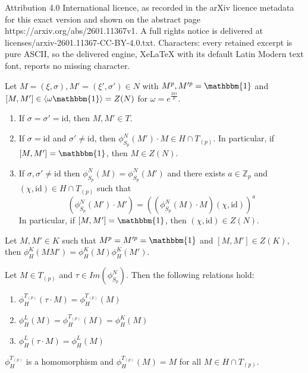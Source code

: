 \documentclass[10pt,a4paper]{amsart}
\newcommand{\Z}{\mathbb Z}
\newcommand{\id}{\mathrm{id}}
\newcommand{\one}{\mathbbm{1}}
\begin{document}
Attribution 4.0 International licence, as recorded in the arXiv licence metadata for this exact version and shown on the abstract page https://arxiv.org/abs/2601.11367v1. A full rights notice is delivered at licenses/arxiv-2601.11367-CC-BY-4.0.txt. Characters: every retained excerpt is pure ASCII, so the delivered engine, XeLaTeX with its default Latin Modern text font, reports no missing character.
\begin{lemma}\label{lem: comm_tildeK}
    Let $M=(\xi,\sigma),M'=(\xi',\sigma')\in N$ with $M^p,M'^p=\one$ and $[M,M']\in \langle\omega\one\rangle=Z(N)$ for $\omega=e^{\frac{2\pi i}{p}}$.
    \begin{enumerate}
    \item If $\sigma=\sigma'=\id$, then $M,M'\in T$.
    \item If $\sigma=\id$ and $\sigma'\neq\id$, then $\phi^N_{S_p}(M')\cdot M\in H\cap T_{(p)}$. In particular, if $[M,M']=\one$, then $M\in Z(N)$.
    \item If $\sigma,\sigma'\neq\id$ then $\phi^N_{S_p}(M)=\phi^N_{S_p}(M')$ and there exists $a\in\Z_p$ and $(\chi,\id)\in H\cap T_{(p)}$ such that
    $$\left(\phi^N_{S_p}(M')\cdot M'\right)=\left((\phi^N_{S_p}(M)\cdot M)(\chi,\id)\right)^a$$ In particular, if $[M,M']=\one$, then $(\chi,\id)\in Z(N)$.
    \end{enumerate}
\end{lemma}

\begin{theorem}{\label{thm:K to H}}
    Let $M,M'\in K$ such that $M^p=M'^p=\one$ and $[M,M']\in Z(K)$, then $\phi^K_H(MM')=\phi^K_H(M)\phi^K_H(M')$.
\end{theorem}

\begin{lemma}{\label{lem: action invariant}}
    Let $M\in T_{(p)}$ and $\tau\in Im(\phi^N_{S_p})$. Then the following relations hold:
    \begin{enumerate}
        \item $\phi^{T_{(p)}}_H(\tau\cdot M)=\phi^{T_{(p)}}_H(M)$
        \item $\phi^L_H(M)=\phi^{T_{(p)}}_H(M)=\phi^K_H(M)$
        \item $\phi^L_H(\tau\cdot M)=\phi^L_H( M)$
    \end{enumerate}
\end{lemma}

\begin{proposition}{\label{prop:tp to h, homo, z_hat invariant}}
    $\phi^{T_{(p)}}_H$ is a homomorphism and $\phi^{T_{(p)}}_H(M)=M$ for all $M\in H\cap T_{(p)}$.
\end{proposition}
\end{document}
